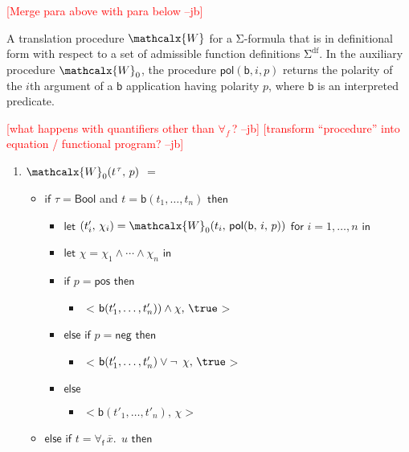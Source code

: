 \documentclass[runningheads,a4paper]{llncs}
\newcommand\return{}
\newcommand\bigtuple[1]{$\bigl<${#1}$\bigr>$}
\newcommand{\con}[1]{\mathsf{#1}}
\renewcommand\vec[1]{\overline{#1}}
\let\oldSigma=\Sigma
\def\Sigma{\mathrm{\oldSigma}}
\let\oldneg=\neg
\def\neg{\oldneg\:}
\newcommand{\conv}{\mathcalx{W}}
\newcommand{\sfundefs}[1]{#1^\mathrm{df}}
\newcommand{\ptrue}{\con{pos}}
\newcommand{\pfalse}{\con{neg}}
\newcommand{\pol}{\con{pol}}
\newcommand{\Bool}{\con{Bool}}
\newcommand{\boolop}{\con{b}}
\newcommand{\forallf}[1]{\forall_{\!#1\:}}
\newcommand{\rem}[1]{\textcolor{red}{[#1]}}
\newcommand{\jb}[1]{\rem{#1 --jb}}
\newcommand{\vthinspace}{\kern+0.083333em}
\newcommand{\typ}[1]{^{\vthinspace #1}}
\begin{document}
\jb{Merge para above with para below}

A translation procedure $\conv$ for a $\Sigma$-formula that is in definitional
form with respect to a set of admissible function definitions
$\sfundefs{\Sigma}$. In the auxiliary procedure $\conv_0$, the procedure $\pol(
\boolop, i, p )$ returns the polarity of the $i${th} argument of a
$\boolop$ application having polarity $p$, where $\boolop$ is an interpreted
predicate.

\jb{what happens with quantifiers other than $\forallf{f}$?}
\jb{transform ``procedure'' into equation / functional program?}

\begin{enumerate}
\item[\ ] 
$\conv_0( t\typ{\tau},\, p )$ $=$
 \begin{itemize}
   \item[] $\mathsf{if}$ $\tau = \Bool$ and $t = \boolop(t_1,\ldots,t_n)$ $\mathsf{then}$
    \begin{itemize}
      \item[] $\mathsf{let}$ $( t'_i,\, \chi_i ) = \conv_0( t_i,\, \pol( \boolop,\, i,\, p ) )$ $\mathsf{for}$ $i = 1, \ldots, n$ $\mathsf{in}$
      \item[] $\mathsf{let}$ $\chi = \chi_1 \mathrel\wedge \cdots \mathrel\wedge \chi_n$ $\mathsf{in}$
      \item[] $\mathsf{if}$ $p = \ptrue$ $\mathsf{then}$
      \begin{itemize}
        \item[] \return \bigtuple{$\boolop(t'_1, \ldots, t'_n) ) \wedge \chi,\, \true$}
      \end{itemize}
      \item[] $\mathsf{else}$ $\mathsf{if}$ $p = \pfalse$ $\mathsf{then}$
      \begin{itemize}
        \item[] \return \bigtuple{$\boolop(t'_1, \ldots, t'_n) \vee \neg \chi,\, \true$}
      \end{itemize}
      \item[] $\mathsf{else}$
      \begin{itemize}
        \item[] \return \bigtuple{$\boolop(t'_1, \ldots, t'_n),\, \chi$}
      \end{itemize}
    \end{itemize}
  \item[] $\mathsf{else}$ $\mathsf{if}$ $t = \forallf{\con{f}} \vec x.\;\, u$ $\mathsf{then}$

\end{itemize}
\end{enumerate}
\end{document}

